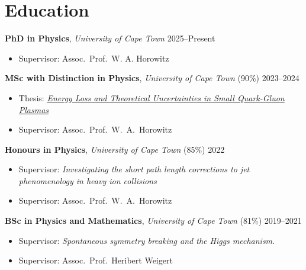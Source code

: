 \documentclass[11pt,letter,sans]{moderncv}
\begin{document}
\nocite{*}
\makecvtitle
\vspace{-1cm}

\section{Education}
    \textbf{PhD in Physics}, \emph{University of Cape Town}
    \hfill 2025--Present \par
  \begin{itemize}
      \item Supervisor: Assoc.\ Prof.\ W. A. Horowitz
  \end{itemize}
  \vspace{3mm}
    \textbf{MSc with Distinction in Physics}, \emph{University of Cape Town}
        (90\%)
    \hfill 2023--2024 \par
  \begin{itemize}
      \item Thesis: \href{https://inspirehep.net/literature/2928736}{\textit{Energy Loss and Theoretical Uncertainties in Small Quark-Gluon Plasmas}} \par
      \item Supervisor: Assoc.\ Prof.\ W.\ A.\ Horowitz
  \end{itemize}
  \vspace{3mm}
    \textbf{Honours in Physics}, \emph{University of Cape Town}
        (85\%)
    \hfill 2022 \par
  \begin{itemize}
      \item Supervisor: \textit{Investigating the short path length corrections to jet phenomenology in heavy ion collisions}
      \item Supervisor: Assoc.\ Prof.\ W.\ A.\ Horowitz
  \end{itemize}
  \vspace{3mm}
    \textbf{BSc in Physics and Mathematics}, \emph{University of Cape Town}
        (81\%)
    \hfill 2019--2021 \par
  \begin{itemize}
      \item Supervisor: \textit{Spontaneous symmetry breaking and the Higgs mechanism.}
      \item Supervisor: Assoc.\ Prof.\ Heribert Weigert
  \end{itemize}
  \vspace{3mm}
\vspace{-3mm}
\end{document}
